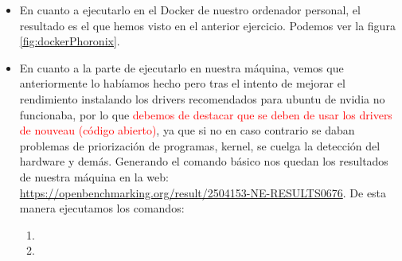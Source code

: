 \begin{itemize}
    \item En cuanto a ejecutarlo en el Docker de nuestro ordenador personal, el resultado es el que hemos visto en el anterior ejercicio. Podemos ver la figura \ref{fig:dockerPhoronix}.
    \item En cuanto a la parte de ejecutarlo en nuestra máquina, vemos que anteriormente lo habíamos hecho pero tras el intento de mejorar el rendimiento instalando los drivers recomendados para ubuntu de nvidia no funcionaba, por lo que \textcolor{red}{debemos de destacar que se deben de usar los drivers de nouveau (código abierto)}, ya que si no en caso contrario se daban problemas de priorización de programas, kernel, se cuelga la detección del hardware y demás. Generando el comando básico nos quedan los resultados de nuestra máquina en la web: \url{https://openbenchmarking.org/result/2504153-NE-RESULTS0676}. De esta manera ejecutamos los comandos: 
    \begin{enumerate}
        \item {}
        \item {}
    \end{enumerate}


\end{itemize}
